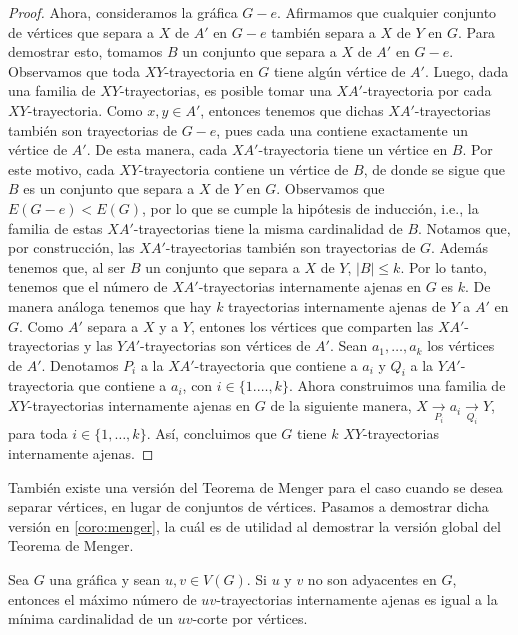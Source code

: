 \begin{proof}
    Ahora, consideramos la gr\'afica $G-e$. Afirmamos que cualquier conjunto de
    v\'ertices que separa a $X$ de $A'$ en $G-e$ tambi\'en separa a $X$ de $Y$
    en $G$. Para demostrar esto, tomamos $B$ un conjunto que separa a $X$ de
    $A'$ en $G-e$. Observamos que toda $XY$-trayectoria en $G$ tiene alg\'un
    v\'ertice de $A'$. Luego, dada una familia de $XY$-trayectorias, es posible
    tomar una $XA'$-trayectoria por cada $XY$-trayectoria. Como $x,y \in A'$,
    entonces tenemos que dichas $XA'$-trayectorias tambi\'en son trayectorias de
    $G-e$, pues cada una contiene exactamente un v\'ertice de $A'$. De esta
    manera, cada $XA'$-trayectoria tiene un v\'ertice en $B$. Por este motivo,
    cada $XY$-trayectoria contiene un v\'ertice de $B$, de donde se sigue que
    $B$ es un conjunto que separa a $X$ de $Y$ en $G$. Observamos que
    $E(G-e)<E(G)$, por lo que se cumple la hip\'otesis de inducci\'on, i.e., la
    familia de estas $XA'$-trayectorias tiene la misma cardinalidad de $B$.
    Notamos que, por construcci\'on, las $XA'$-trayectorias tambi\'en son
    trayectorias de $G$. Adem\'as tenemos que, al ser $B$ un conjunto que separa
    a $X$ de $Y$, $|B| \leq k$. Por lo tanto, tenemos que el n\'umero de
    $XA'$-trayectorias internamente ajenas en $G$ es $k$. De manera an\'aloga
    tenemos que hay $k$ trayectorias internamente ajenas de $Y$ a $A'$ en $G$.
    Como $A'$ separa a $X$ y a $Y$, entones los v\'ertices que comparten las
    $XA'$-trayectorias y las $YA'$-trayectorias son v\'ertices de $A'$. Sean
    $a_1, \dots, a_k$ los v\'ertices de $A'$. Denotamos $P_i$ a la
    $XA'$-trayectoria que contiene a $a_i$ y $Q_i$ a la $YA'$-trayectoria que
    contiene a $a_i$, con $i \in \{1. \dots, k\}$. Ahora construimos una familia
    de $XY$-trayectorias internamente ajenas en $G$ de la siguiente manera, $X
    \xrightarrow[P_i]{} a_i \xrightarrow[Q_i]{} Y$, para toda $i \in \{1, \dots,
    k\}$. As\'i, concluimos que $G$ tiene $k$ $XY$-trayectorias internamente
    ajenas. 
\end{proof}

 Tambi\'en existe una versi\'on del Teorema de Menger para el caso cuando se
 desea separar v\'ertices, en lugar de conjuntos de v\'ertices. Pasamos a
 demostrar dicha versi\'on en \cref{coro:menger}, la cu\'al es de utilidad al
 demostrar la versi\'on global del Teorema de Menger.

 \begin{corolario}
    \label{coro:menger}
    Sea $G$ una gr\'afica y sean $u, v \in V(G)$. Si $u$ y $v$ no son adyacentes
    en $G$, entonces el m\'aximo n\'umero de $uv$-trayectorias internamente
    ajenas es igual a la m\'inima cardinalidad de un $uv$-corte por v\'ertices.
\end{corolario}


